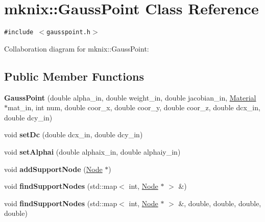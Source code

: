 \hypertarget{classmknix_1_1GaussPoint}{
\section{mknix::GaussPoint Class Reference}
\label{classmknix_1_1GaussPoint}
}
{\tt \#include $<$gausspoint.h$>$}

Collaboration diagram for mknix::GaussPoint:\subsection*{Public Member Functions}
\begin{CompactItemize}
\item 
\hypertarget{classmknix_1_1GaussPoint_f381d945eb5e3aa928180bd1a4771842}{
\textbf{GaussPoint} (double alpha\_\-in, double weight\_\-in, double jacobian\_\-in, \hyperlink{classmknix_1_1Material}{Material} $\ast$mat\_\-in, int num, double coor\_\-x, double coor\_\-y, double coor\_\-z, double dcx\_\-in, double dcy\_\-in)}
\label{classmknix_1_1GaussPoint_f381d945eb5e3aa928180bd1a4771842}

\item 
\hypertarget{classmknix_1_1GaussPoint_6eca1406e1ac3a7f6ad3cad8d42a49f8}{
void \textbf{setDc} (double dcx\_\-in, double dcy\_\-in)}
\label{classmknix_1_1GaussPoint_6eca1406e1ac3a7f6ad3cad8d42a49f8}

\item 
\hypertarget{classmknix_1_1GaussPoint_0ac8a5a2f4c242f7aa1fc2b58b22d4f6}{
void \textbf{setAlphai} (double alphaix\_\-in, double alphaiy\_\-in)}
\label{classmknix_1_1GaussPoint_0ac8a5a2f4c242f7aa1fc2b58b22d4f6}

\item 
\hypertarget{classmknix_1_1GaussPoint_f7d44963ff5562bf6774ee63c5067902}{
void \textbf{addSupportNode} (\hyperlink{classmknix_1_1Node}{Node} $\ast$)}
\label{classmknix_1_1GaussPoint_f7d44963ff5562bf6774ee63c5067902}

\item 
\hypertarget{classmknix_1_1GaussPoint_4d5ee921d474c0692344a9651ae0bd0f}{
void \textbf{findSupportNodes} (std::map$<$ int, \hyperlink{classmknix_1_1Node}{Node} $\ast$ $>$ \&)}
\label{classmknix_1_1GaussPoint_4d5ee921d474c0692344a9651ae0bd0f}

\item 
\hypertarget{classmknix_1_1GaussPoint_5fbd86be6971926c666dee143677bf01}{
void \textbf{findSupportNodes} (std::map$<$ int, \hyperlink{classmknix_1_1Node}{Node} $\ast$ $>$ \&, double, double, double, double)}
\label{classmknix_1_1GaussPoint_5fbd86be6971926c666dee143677bf01}


\end{CompactItemize}
